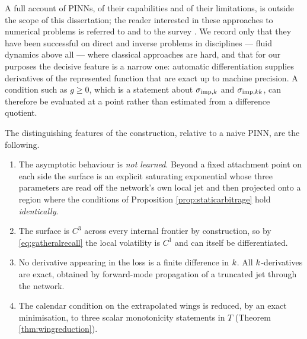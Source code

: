 A full account of PINNs, of their capabilities and of their limitations, is outside the scope of this
dissertation; the reader interested in these approaches to numerical problems is referred to
\cite{raissi2019} and to the survey \cite{karniadakis2021}. We record only that they have been
successful on direct and inverse problems in disciplines --- fluid dynamics above all --- where
classical approaches are hard, and that for our purposes the decisive feature is a narrow one:
automatic differentiation \cite{baydin2018} supplies derivatives of the represented function that
are exact up to machine precision. A condition such as $g\ge0$, which is a statement about
$\sigma_{\mathrm{imp},k}$ and $\sigma_{\mathrm{imp},kk}$, can therefore be evaluated at a point rather than estimated from a
difference quotient.

The distinguishing features of the construction, relative to a naive PINN, are the following.

\begin{enumerate}
  \item The asymptotic behaviour is \emph{not learned}. Beyond a fixed attachment point on each side
    the surface is an explicit saturating exponential whose three parameters are read off the
    network's own local jet and then projected onto a region where the conditions of Proposition
     \ref{prop:staticarbitrage} hold \emph{identically}. 
  \item The surface is $C^{3}$ across every internal frontier by construction, so by
    \eqref{eq:gatheralrecall} the local volatility is $C^{1}$ and can itself be differentiated.
  \item No derivative appearing in the loss is a finite difference in $k$. All
    $k$-derivatives are exact, obtained by forward-mode propagation of a truncated jet through
    the network.
  \item The calendar condition on the extrapolated wings is reduced, by an exact minimisation, to
    three scalar monotonicity statements in $T$ (Theorem \ref{thm:wingreduction}).
\end{enumerate}



